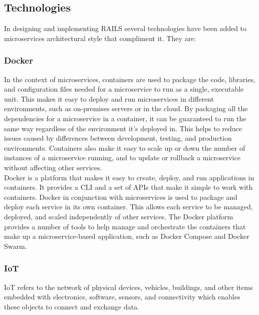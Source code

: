 \subsection{Technologies}
In designing and implementing \ac{RAILS} several technologies have been added to microservices architectural style that compliment it. They are:
\subsubsection{Docker}
In the context of microservices, containers are used to package the code, libraries, and configuration files needed for a microservice to run as a single, executable unit. This makes it easy to deploy and run microservices in different environments, such as on-premises servers or in the cloud. By packaging all the dependencies for a microservice in a container, it can be guaranteed to run the same way regardless of the environment it's deployed in. This helps to reduce issues caused by differences between development, testing, and production environments. Containers also make it easy to scale up or down the number of instances of a microservice running, and to update or rollback a microservice without affecting other services.\vspace{5mm} \\
Docker is a platform that makes it easy to create, deploy, and run applications in containers. It provides a \ac{CLI} and a set of \acp{API} that make it simple to work with containers. Docker in conjunction with microservices is used to package and deploy each service in its own container. This allows each service to be managed, deployed, and scaled independently of other services. The Docker platform provides a number of tools to help manage and orchestrate the containers that make up a microservice-based application, such as Docker Compose and Docker Swarm.
\subsubsection{IoT}
\ac{IoT} refers to the network of physical devices, vehicles, buildings, and other items embedded with electronics, software, sensors, and connectivity which enables these objects to connect and exchange data.
